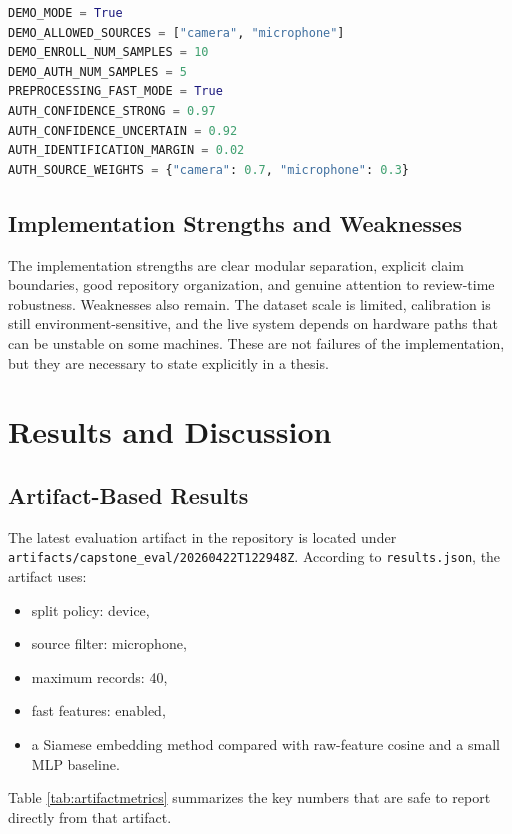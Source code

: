 \documentclass[12pt]{report}
\begin{document}
\begin{lstlisting}[language=Python,caption={Demo-mode configuration pattern},label={lst:configsnippet}]
DEMO_MODE = True
DEMO_ALLOWED_SOURCES = ["camera", "microphone"]
DEMO_ENROLL_NUM_SAMPLES = 10
DEMO_AUTH_NUM_SAMPLES = 5
PREPROCESSING_FAST_MODE = True
AUTH_CONFIDENCE_STRONG = 0.97
AUTH_CONFIDENCE_UNCERTAIN = 0.92
AUTH_IDENTIFICATION_MARGIN = 0.02
AUTH_SOURCE_WEIGHTS = {"camera": 0.7, "microphone": 0.3}
\end{lstlisting}

\section{Implementation Strengths and Weaknesses}
The implementation strengths are clear modular separation, explicit claim boundaries, good repository organization, and genuine attention to review-time robustness. Weaknesses also remain. The dataset scale is limited, calibration is still environment-sensitive, and the live system depends on hardware paths that can be unstable on some machines. These are not failures of the implementation, but they are necessary to state explicitly in a thesis.

\chapter{Results and Discussion}
\section{Artifact-Based Results}
The latest evaluation artifact in the repository is located under \texttt{artifacts/capstone\_eval/20260422T122948Z}. According to \texttt{results.json}, the artifact uses:
\begin{itemize}[leftmargin=1.2cm]
\item split policy: device,
\item source filter: microphone,
\item maximum records: 40,
\item fast features: enabled,
\item a Siamese embedding method compared with raw-feature cosine and a small MLP baseline.
\end{itemize}

Table \ref{tab:artifactmetrics} summarizes the key numbers that are safe to report directly from that artifact.
\end{document}
